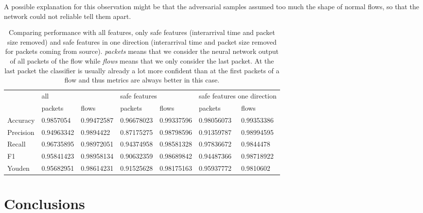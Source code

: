 \documentclass[conference]{IEEEtran}
\begin{document}

A possible explanation for this observation might be that the adversarial samples assumed too much the shape of normal flows, so that the network could not reliable tell them apart.

\begin{table}
\caption{Comparing performance with all features, only safe features (interarrival time and packet size removed) and safe features in one direction (interarrival time and packet size removed for packets coming from source). \textit{packets} means that we consider the neural network output of all packets of the flow while \textit{flows} means that we only consider the last packet. At the last packet the classifier is usually already a lot more confident than at the first packets of a flow and thus metrics are always better in this case.}  \label{tab:performance_results_no_manipulable}
\newcommand{\cmidrulespace}{6pt}
\centering
\begin{tabular}{l l l l l l l} \toprule
& \multicolumn{2}{l}{all} & \multicolumn{2}{l}{safe features} & \multicolumn{2}{l}{safe features one direction} \\
\cmidrule(r){2-3} \cmidrule(lr){4-5} \cmidrule(l){6-7}
& packets & flows & packets & flows & packets & flows \\
\midrule
Accuracy & 0.9857054 & 0.99472587 & 0.96678023 & 0.99337596 & 0.98056073 & 0.99353386 \\
Precision & 0.94963342 & 0.9894422 & 0.87175275 & 0.98798596 & 0.91359787 & 0.98994595 \\
Recall & 0.96735895 & 0.98972051 & 0.94374958 & 0.98581328 & 0.97836672 & 0.9844478 \\
F1 & 0.95841423 & 0.98958134 & 0.90632359 & 0.98689842 & 0.94487366 & 0.98718922 \\
Youden & 0.95682951 & 0.98614231 & 0.91525628 & 0.98175163 & 0.95937772 & 0.9810602 \\
\bottomrule
\end{tabular}
\end{table}


\section{Conclusions}
\end{document}
